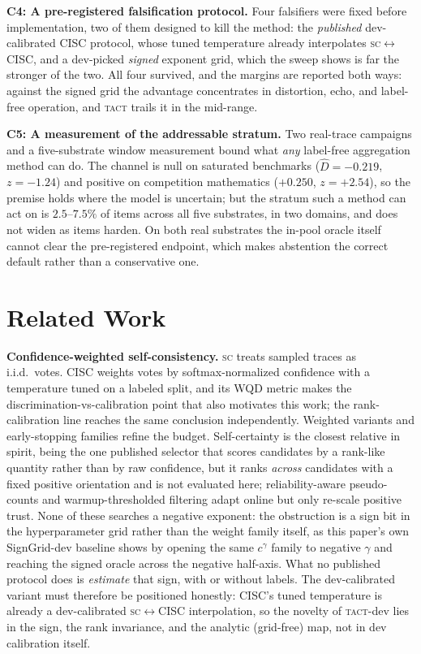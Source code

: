 \documentclass{article}
\newcommand{\Dhat}{\widehat{D}}
\newcommand{\SC}{\textsc{sc}}
\newcommand{\TACT}{\textsc{tact}}
\begin{document}
\textbf{C4: A pre-registered falsification protocol.} Four falsifiers were
fixed before implementation, two of them designed to kill the method: the
\emph{published} dev-calibrated CISC protocol, whose tuned temperature already
interpolates \SC$\leftrightarrow$CISC, and a dev-picked \emph{signed} exponent
grid, which the sweep shows is far the stronger of the two. All four survived,
and the margins are reported both ways: against the signed grid the advantage
concentrates in distortion, echo, and label-free operation, and \TACT{} trails
it in the mid-range.

\textbf{C5: A measurement of the addressable stratum.} Two real-trace
campaigns and a five-substrate window measurement bound what \emph{any}
label-free aggregation method can do. The channel is null on saturated
benchmarks ($\Dhat=-0.219$, $z=-1.24$) and positive on competition
mathematics ($+0.250$, $z=+2.54$), so the premise holds where the model is
uncertain; but the stratum such a method can act on is $2.5$--$7.5\%$ of items
across all five substrates, in two domains, and does not widen as items
harden.
On both real substrates the in-pool oracle itself cannot clear the
pre-registered endpoint, which makes abstention the correct default rather
than a conservative one.

\section{Related Work}\label{sec:related}

\textbf{Confidence-weighted self-consistency.} \SC{} \citep{wang2023selfconsistency} treats sampled traces as i.i.d.\ votes. CISC \citep{taubenfeld2025cisc} weights votes by softmax-normalized confidence with a temperature tuned on a labeled split, and its WQD metric makes the discrimination-vs-calibration point that also motivates this work; the rank-calibration line \citep{huang2024rankcalibration} reaches the same conclusion independently. Weighted variants \citep{li2023diverse} and early-stopping families
\citep{aggarwal2023adaptive,li2024escape} refine the budget. Self-certainty
\citep{borda2025} is the closest relative in spirit, being the one published
selector that scores candidates by a rank-like quantity rather than by raw
confidence, but it ranks \emph{across} candidates with a fixed positive
orientation and is not evaluated here; reliability-aware pseudo-counts \citep{reasc2026} and warmup-thresholded filtering \citep{deepconf2025} adapt online but only re-scale positive trust. None of these searches a negative exponent: the obstruction is a sign bit in
the hyperparameter grid rather than the weight family itself, as this paper's
own SignGrid-dev baseline shows by opening the same $c^{\gamma}$ family to
negative $\gamma$ and reaching the signed oracle across the negative half-axis.
What no published protocol does is \emph{estimate} that sign, with or without
labels. The dev-calibrated variant must therefore be positioned honestly: CISC's tuned temperature is already a dev-calibrated \SC$\leftrightarrow$CISC interpolation, so the novelty of \TACT-dev lies in the sign, the rank invariance, and the analytic (grid-free) map, not in dev calibration itself.
\end{document}
